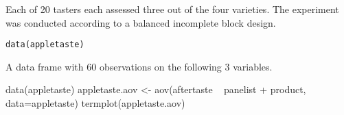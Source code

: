 \begin{Description}\relax
Each of 20 tasters each assessed three out of the four varieties.
The experiment was conducted according to a balanced incomplete
block design.
\end{Description}
\begin{Usage}
\begin{verbatim}data(appletaste)\end{verbatim}
\end{Usage}
\begin{Format}\relax
A data frame with 60 observations on the following 3 variables.
\end{Format}
\begin{Examples}
\begin{ExampleCode}
data(appletaste)
appletaste.aov <- aov(aftertaste ~ panelist + product, data=appletaste)
termplot(appletaste.aov)
\end{ExampleCode}
\end{Examples}

